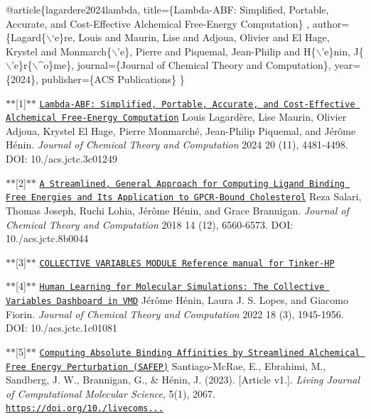 \begin{DoxyCode}
@article\{lagardere2024lambda,
  title=\{Lambda-ABF: Simplified, Portable, Accurate, and Cost-Effective Alchemical Free-Energy Computation\}
      ,
  author=\{Lagard\{\(\backslash\)`e\}re, Louis and Maurin, Lise and Adjoua, Olivier and El Hage, Krystel and Monmarch\{\(\backslash\)\textcolor{stringliteral}{'e\},
       Pierre and Piquemal, Jean-Philip and H\{\(\backslash\)'e\}nin, J\{\(\backslash\)'e\}r\{\(\backslash\)^o\}me\},}
\textcolor{stringliteral}{  journal=\{Journal of Chemical Theory and Computation\},}
\textcolor{stringliteral}{  year=\{2024\},}
\textcolor{stringliteral}{  publisher=\{ACS Publications\}}
\textcolor{stringliteral}{\}}
\end{DoxyCode}
 



\label{lambda_abf_ref1}%
\hypertarget{lambda_abf_ref1}{}%
$\ast$$\ast$\mbox{[}1\mbox{]}$\ast$$\ast$ \href{https://doi.org/10.1021/acs.jctc.3c01249}{\tt Lambda-\/\-A\-B\-F\-: Simplified, Portable, Accurate, and Cost-\/\-Effective Alchemical Free-\/\-Energy Computation} Louis Lagardère, Lise Maurin, Olivier Adjoua, Krystel El Hage, Pierre Monmarché, Jean-\/\-Philip Piquemal, and Jérôme Hénin. {\itshape Journal of Chemical Theory and Computation} 2024 20 (11), 4481-\/4498. D\-O\-I\-: 10./acs.jctc.\-3c01249

\label{lambda_abf_ref2}%
\hypertarget{lambda_abf_ref2}{}%
$\ast$$\ast$\mbox{[}2\mbox{]}$\ast$$\ast$ \href{https://doi.org/10.1021/acs.jctc.8b00447}{\tt A Streamlined, General Approach for Computing Ligand Binding Free Energies and Its Application to G\-P\-C\-R-\/\-Bound Cholesterol} Reza Salari, Thomas Joseph, Ruchi Lohia, Jérôme Hénin, and Grace Brannigan. {\itshape Journal of Chemical Theory and Computation} 2018 14 (12), 6560-\/6573. D\-O\-I\-: 10./acs.jctc.\-8b0044

\label{lambda_abf_ref3}%
\hypertarget{lambda_abf_ref3}{}%
$\ast$$\ast$\mbox{[}3\mbox{]}$\ast$$\ast$ \href{https://colvars.github.io/master/colvars-refman-tinkerhp.pdf}{\tt C\-O\-L\-L\-E\-C\-T\-I\-V\-E V\-A\-R\-I\-A\-B\-L\-E\-S M\-O\-D\-U\-L\-E Reference manual for Tinker-\/\-H\-P}

\label{lambda_abf_ref4}%
\hypertarget{lambda_abf_ref4}{}%
$\ast$$\ast$\mbox{[}4\mbox{]}$\ast$$\ast$ \href{https://pubs.acs.org/doi/abs/10.1021/acs.jctc.1c01081}{\tt Human Learning for Molecular Simulations\-: The Collective Variables Dashboard in V\-M\-D} Jérôme Hénin, Laura J. S. Lopes, and Giacomo Fiorin. {\itshape Journal of Chemical Theory and Computation} 2022 18 (3), 1945-\/1956. D\-O\-I\-: 10./acs.jctc.\-1c01081

\label{lambda_abf_ref5}%
\hypertarget{lambda_abf_ref5}{}%
$\ast$$\ast$\mbox{[}5\mbox{]}$\ast$$\ast$ \href{https://livecomsjournal.org/index.php/livecoms/article/view/v5i1e2067}{\tt Computing Absolute Binding Affinities by Streamlined Alchemical Free Energy Perturbation (S\-A\-F\-E\-P)} Santiago-\/\-Mc\-Rae, E., Ebrahimi, M., Sandberg, J. W., Brannigan, G., \& Hénin, J. (2023). \mbox{[}Article v1.\mbox{]}. {\itshape Living Journal of Computational Molecular Science}, 5(1), 2067. \href{https://doi.org/10.33011/livecoms.5.1.2067}{\tt https\-://doi.\-org/10./livecoms...} 
